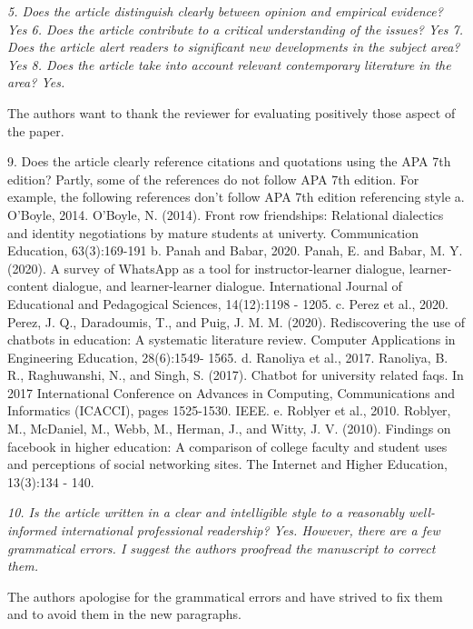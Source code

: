 \documentclass{letter}
\begin{document}
{\it 5.      Does the article distinguish clearly between opinion and empirical evidence? Yes
6.      Does the article contribute to a critical understanding of the issues? Yes
7.      Does the article alert readers to significant new developments in the subject area? Yes
8.      Does the article take into account relevant contemporary literature in the area? Yes.}

The authors want to thank the reviewer for evaluating positively those aspect of the paper.


9.      Does the article clearly reference citations and quotations using the APA 7th edition? Partly, some of the references do not follow APA 7th edition. For example, the following references don't follow APA 7th edition referencing style
     a.   O'Boyle, 2014. O'Boyle, N. (2014). Front row friendships: Relational dialectics and identity negotiations by mature students at univerty. Communication Education, 63(3):169-191
     b. Panah and Babar, 2020. Panah, E. and Babar, M. Y. (2020). A survey of WhatsApp as a tool for instructor-learner dialogue, learner-content dialogue, and learner-learner dialogue. International Journal of Educational and Pedagogical
 Sciences, 14(12):1198 - 1205.
     c. Perez et al., 2020. Perez, J. Q., Daradoumis, T., and Puig, J. M. M. (2020). Rediscovering the use of chatbots in education: A systematic literature review. Computer Applications in Engineering Education, 28(6):1549- 1565.
     d. Ranoliya et al., 2017. Ranoliya, B. R., Raghuwanshi, N., and Singh, S. (2017). Chatbot for university related faqs. In 2017 International Conference on Advances in Computing, Communications and Informatics (ICACCI), pages 1525-1530. IEEE.
     e. Roblyer et al., 2010. Roblyer, M., McDaniel, M., Webb, M., Herman, J., and Witty, J. V. (2010). Findings on facebook in higher education: A comparison of college faculty and student uses and perceptions of social networking sites. The Internet and Higher Education, 13(3):134 - 140.


{\it 10.     Is the article written in a clear and intelligible style to a reasonably well-informed international professional readership? Yes. However, there are a few grammatical errors. I suggest the authors proofread the manuscript to correct them.}

The authors apologise for the grammatical errors and have strived to fix them and to avoid them in the new paragraphs.
\end{document}
